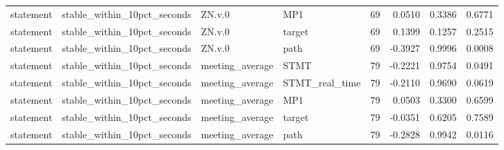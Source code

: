 \begin{tabular}{llllrrrr}
statement & stable_within_10pct_seconds & ZN.v.0 & MP1 & 69 & 0.0510 & 0.3386 & 0.6771 \\
statement & stable_within_10pct_seconds & ZN.v.0 & target & 69 & 0.1399 & 0.1257 & 0.2515 \\
statement & stable_within_10pct_seconds & ZN.v.0 & path & 69 & -0.3927 & 0.9996 & 0.0008 \\
statement & stable_within_10pct_seconds & meeting_average & STMT & 79 & -0.2221 & 0.9754 & 0.0491 \\
statement & stable_within_10pct_seconds & meeting_average & STMT_real_time & 79 & -0.2110 & 0.9690 & 0.0619 \\
statement & stable_within_10pct_seconds & meeting_average & MP1 & 79 & 0.0503 & 0.3300 & 0.6599 \\
statement & stable_within_10pct_seconds & meeting_average & target & 79 & -0.0351 & 0.6205 & 0.7589 \\
statement & stable_within_10pct_seconds & meeting_average & path & 79 & -0.2828 & 0.9942 & 0.0116 \\
\bottomrule
\end{tabular}
